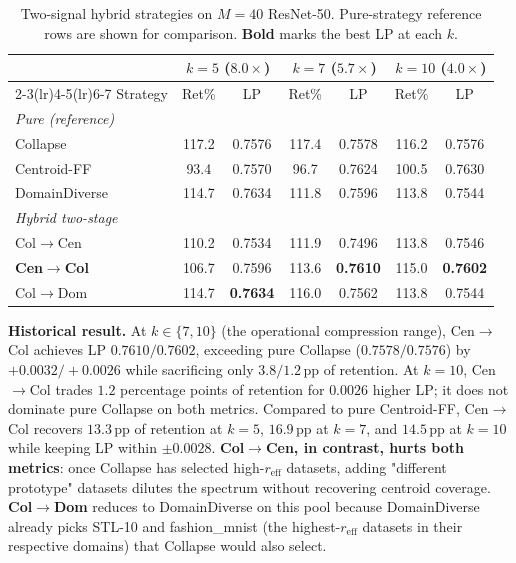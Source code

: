 \documentclass{article}
\newcommand{\reff}{\ensuremath{r_{\mathrm{eff}}}\xspace}
\begin{document}
\begin{table}[h]
\centering
\caption{Two-signal hybrid strategies on $M{=}40$ ResNet-50.
Pure-strategy reference rows are shown for comparison.
\textbf{Bold} marks the best LP at each $k$.}
\label{tab:p2e_hybrid}
\small
\setlength{\tabcolsep}{4pt}
\begin{tabular}{lcccccc}
\toprule
& \multicolumn{2}{c}{$k{=}5$ ($8.0{\times}$)} & \multicolumn{2}{c}{$k{=}7$ ($5.7{\times}$)} & \multicolumn{2}{c}{$k{=}10$ ($4.0{\times}$)} \\
\cmidrule(lr){2-3}\cmidrule(lr){4-5}\cmidrule(lr){6-7}
Strategy & Ret\% & LP & Ret\% & LP & Ret\% & LP \\
\midrule
\multicolumn{7}{l}{\textit{Pure (reference)}} \\
Collapse                  & 117.2 & 0.7576 & 117.4 & 0.7578 & 116.2 & 0.7576 \\
Centroid-FF               &  93.4 & 0.7570 &  96.7 & 0.7624 & 100.5 & 0.7630 \\
DomainDiverse             & 114.7 & 0.7634 & 111.8 & 0.7596 & 113.8 & 0.7544 \\
\midrule
\multicolumn{7}{l}{\textit{Hybrid two-stage}} \\
Col$\to$Cen               & 110.2 & 0.7534 & 111.9 & 0.7496 & 113.8 & 0.7546 \\
\textbf{Cen$\to$Col}      & 106.7 & 0.7596 & 113.6 & \textbf{0.7610} & 115.0 & \textbf{0.7602} \\
Col$\to$Dom               & 114.7 & \textbf{0.7634} & 116.0 & 0.7562 & 113.8 & 0.7544 \\
\bottomrule
\end{tabular}\normalsize
\end{table}

\textbf{Historical result.}
At $k{\in}\{7,10\}$ (the operational compression range), Cen$\to$Col
achieves LP $0.7610/0.7602$, exceeding pure Collapse
($0.7578/0.7576$) by ${+}0.0032/{+}0.0026$ while sacrificing only
$3.8/1.2$\,pp of retention.
At $k{=}10$, Cen$\to$Col trades $1.2$ percentage points of retention for
$0.0026$ higher LP; it does not dominate pure Collapse on both metrics.
Compared to pure Centroid-FF, Cen$\to$Col recovers $13.3$\,pp of retention
at $k{=}5$, $16.9$\,pp at $k{=}7$, and $14.5$\,pp at $k{=}10$ while
keeping LP within $\pm0.0028$.
\textbf{Col$\to$Cen, in contrast, hurts both metrics}: once Collapse has
selected high-$\reff$ datasets, adding "different prototype" datasets
dilutes the spectrum without recovering centroid coverage.
\textbf{Col$\to$Dom} reduces to DomainDiverse on this pool because
DomainDiverse already picks STL-10 and fashion\_mnist
(the highest-$\reff$ datasets in their respective domains)
that Collapse would also select.
\end{document}
